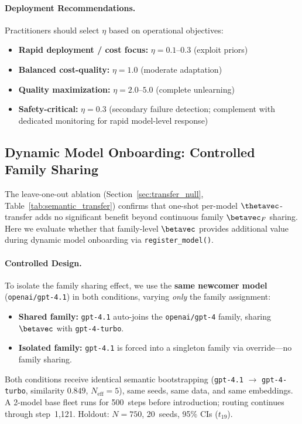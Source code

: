 \paragraph{Deployment Recommendations.}
Practitioners should select $\eta$ based on operational objectives:
\begin{itemize}[nosep]
    \item \textbf{Rapid deployment / cost focus:} $\eta=0.1$--$0.3$ (exploit priors)
    \item \textbf{Balanced cost-quality:} $\eta=1.0$ (moderate adaptation)
    \item \textbf{Quality maximization:} $\eta=2.0$--$5.0$ (complete unlearning)
    \item \textbf{Safety-critical:} $\eta=0.3$ (secondary failure detection; complement with dedicated monitoring for rapid model-level response)
\end{itemize}



\subsection{Dynamic Model Onboarding: Controlled Family Sharing}
\label{app:model_onboarding_figure}

The leave-one-out ablation (Section~\ref{sec:transfer_null}, Table~\ref{tab:semantic_transfer}) confirms that one-shot per-model $\thetavec$-transfer adds no significant benefit beyond continuous family $\betavec_F$ sharing. Here we evaluate whether that family-level $\betavec$ provides additional value during dynamic model onboarding via \texttt{register\_model()}.

\paragraph{Controlled Design.}
To isolate the family sharing effect, we use the \textbf{same newcomer model} (\texttt{openai/gpt-4.1}) in both conditions, varying \emph{only} the family assignment:
\begin{itemize}[nosep]
    \item \textbf{Shared family:} \texttt{gpt-4.1} auto-joins the \texttt{openai/gpt-4} family, sharing $\betavec$ with \texttt{gpt-4-turbo}.
    \item \textbf{Isolated family:} \texttt{gpt-4.1} is forced into a singleton family via override---no family sharing.
\end{itemize}
Both conditions receive identical semantic bootstrapping (\texttt{gpt-4.1} $\to$ \texttt{gpt-4-turbo}, similarity $0.849$, $N_{\text{eff}}{=}5$), same seeds, same data, and same embeddings. A 2-model base fleet runs for 500~steps before introduction; routing continues through step~1,121. Holdout: $N{=}750$, 20~seeds, 95\% CIs ($t_{19}$).

